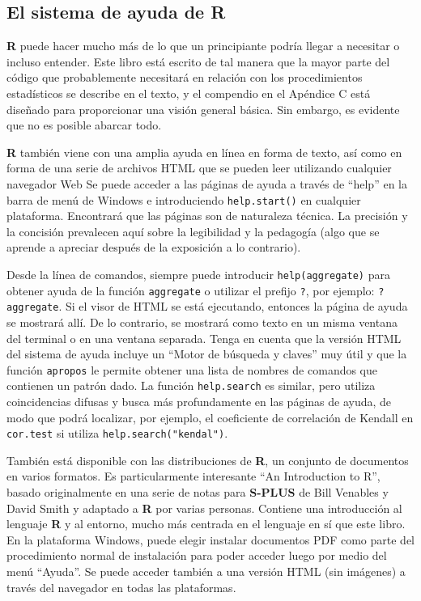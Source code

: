 \subsection{El sistema de ayuda de R}

\textbf{R} puede hacer mucho más de lo que un principiante podría llegar a
necesitar o incluso entender. Este libro está escrito de tal manera que la
mayor parte del código que probablemente necesitará en relación con los
procedimientos estadísticos se describe en el texto, y el compendio en el
Apéndice C está diseñado para proporcionar una visión general básica. Sin
embargo, es evidente que no es posible abarcar todo.

\textbf{R} también viene con una amplia ayuda en línea en forma de texto, así
como en forma de una serie de archivos HTML que se pueden leer utilizando
cualquier navegador Web Se puede acceder a las páginas de ayuda a través de
``help'' en la barra de menú de Windows e introduciendo \texttt{help.start()} en
cualquier plataforma. Encontrará que las páginas son de naturaleza técnica. La
precisión y la concisión prevalecen aquí sobre la legibilidad y la pedagogía
(algo que se aprende a apreciar después de la exposición a lo contrario).

Desde la línea de comandos, siempre puede introducir \texttt{help(aggregate)}
para obtener ayuda de la función \texttt{aggregate} o utilizar el prefijo
\texttt{?}, por ejemplo: \texttt{?aggregate}. Si el visor de HTML se está
ejecutando, entonces la página de ayuda se mostrará allí. De lo contrario, se
mostrará como texto en un misma ventana del terminal o en una ventana separada.
Tenga en cuenta que la versión HTML del sistema de ayuda incluye un ``Motor de
búsqueda y claves'' muy útil y que la función \texttt{apropos} le permite
obtener una lista de nombres de comandos que contienen un patrón dado. La
función \texttt{help.search} es similar, pero utiliza coincidencias difusas y
busca más profundamente en las páginas de ayuda, de modo que podrá localizar,
por ejemplo, el coeficiente de correlación de Kendall en \texttt{cor.test} si
utiliza \texttt{help.search("kendal")}.

También está disponible con las distribuciones de \textbf{R}, un conjunto de
documentos en varios formatos. Es particularmente interesante ``An Introduction
to R'', basado originalmente en una serie de notas para \textbf{S-PLUS} de Bill
Venables y David Smith y adaptado a \textbf{R} por varias personas.  Contiene
una introducción al lenguaje \textbf{R} y al entorno, mucho más centrada en el
lenguaje en sí que este libro. En la plataforma Windows, puede elegir instalar
documentos PDF como parte del procedimiento normal de instalación para poder
acceder luego por medio del menú ``Ayuda''.  Se puede acceder también a una
versión HTML (sin imágenes) a través del navegador en todas las plataformas.

